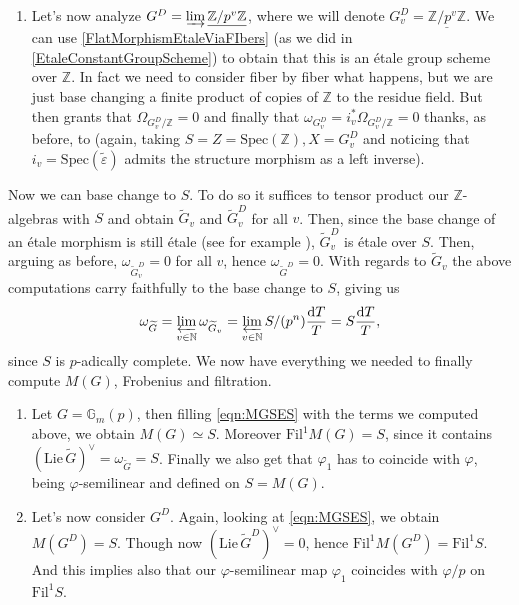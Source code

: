 \begin{ex}[]
\begin{enumerate}
	\item Let's now analyze $G^D = \varinjlim \underline{\mathbb{Z}/p^v\mathbb{Z}}$, where
		we will denote $G_v^D = \underline{\mathbb{Z}/p^v\mathbb{Z}}$.
		We can use \cref{FlatMorphismEtaleViaFIbers} (as we did in
		\cref{EtaleConstantGroupScheme}) to obtain that this is an étale
		group scheme over $\mathbb{Z}$.
		In fact we need to consider fiber by fiber what happens, but we are
		just base changing a finite product of copies of $\mathbb{Z}$ to the
		residue field.
		But then \cite[\href{https://stacks.math.columbia.edu/tag/00U0}{Section 00U0}]{SP}
		grants that $\Omega_{G_v^D/\mathbb{Z}} = 0$
		and finally that $\omega_{G_v^D} = i^*_v \Omega_{G^D_v/\mathbb{Z}} = 0$ thanks,
		as before, to
		\cite[\href{https://stacks.math.columbia.edu/tag/0474}{Lemma 0474}]{SP}
		(again, taking $S = Z = \mathrm{Spec}(\mathbb{Z}), X = G_v^D$
		and noticing that $i_v = \mathrm{Spec}(\widetilde{\varepsilon})$ admits the structure morphism
		as a left inverse).
\end{enumerate}
	Now we can base change to $S$.
	To do so it suffices to tensor product our $\mathbb{Z}$-algebras
	with $S$ and obtain $\widetilde{G}_v$ and $\widetilde{G}_v^D$ for all $v$.
	Then, since the base change of an étale morphism is still étale (see for example
	\cite[\href{https://stacks.math.columbia.edu/tag/02GO}{Lemma 02GO}]{SP}),
	$\widetilde{G}_v^D$ is étale over $S$.
	Then, arguing as before, $\omega_{\widetilde{G}_v^D} = 0$ for all $v$,
	hence $\omega_{\widetilde{G}^D} = 0$.
	With regards to $\widetilde{G}_v$ the above computations carry faithfully
	to the base change to $S$, giving us
	\begin{equation*}
	\omega_{\widetilde{G}} = \varprojlim_{v \in \mathbb{N}} \omega_{\widetilde{G}_v} =
	\varprojlim_{v \in \mathbb{N}} S/ (p^n) \frac{ \mathrm{d}T }{ T } = S \frac{ \mathrm{d}T }{ T }
	,\end{equation*}
	since $S$ is $p$-adically complete.
	We now have everything we needed to finally compute $M(G)$, Frobenius and filtration.
\begin{enumerate}
	\item Let $G = \mathbb{G}_m(p)$, then filling \cref{eqn:MGSES} with
		the terms we computed above, we obtain $M(G) \simeq S$.
		Moreover $\mathrm{Fil}^1 M(G) = S$, since it contains
		$(\mathrm{Lie}\, \widetilde{G})^\vee = \omega_{\widetilde{G}} = S$.
		Finally we also get that $\varphi_1$ has to coincide with $\varphi$,
		being $\varphi$-semilinear and defined on $S = M(G)$.

	\item Let's now consider $G^D$.
		Again, looking at \cref{eqn:MGSES}, we obtain $M(G^D) = S$.
		Though now $(\mathrm{Lie}\, \widetilde{G}^D)^\vee = 0$,
		hence $\mathrm{Fil}^1 M(G^D) = \mathrm{Fil}^1 S$.
		And this implies also that our $\varphi$-semilinear map
		$\varphi_1$ coincides with $\varphi/p$ on $\mathrm{Fil}^1S$.
\end{enumerate}
\end{ex}
